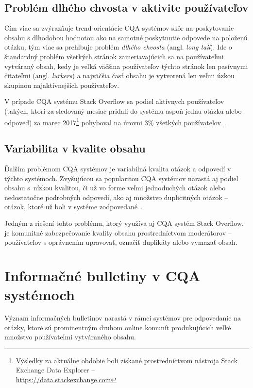 \subsection{Problém dlhého chvosta v aktivite používateľov}
Čím viac sa zvýrazňuje trend orientácie CQA systémov skôr na poskytovanie obsahu s dlhodobou hodnotou ako na samotné
poskytnutie odpovede na položenú otázku, tým viac sa prehlbuje problém \emph{dlhého chvosta} (angl. \emph{long tail}).
Ide o štandardný problém všetkých stránok zameriavajúcich sa na používateľmi vytváraný obsah, kedy je veľká väčšina
používateľov týchto stránok len pasívnymi čitateľmi (angl. \emph{lurkers}) a najväčšia časť obsahu je vytvorená len veľmi
úzkou skupinou najaktívnejších používateľov.

V prípade CQA systému Stack Overflow sa podiel aktívnych používateľov (takých, ktorí za sledovaný mesiac pridali
do systému aspoň jednu otázku alebo odpoveď) za marec 2017\footnote{Výsledky za aktuálne obdobie boli získané prostredníctvom nástroja Stack
Exchange Data Explorer -- \\\url{https://data.stackexchange.com}} pohyboval na úrovni 3\% všetkých
používateľov~\cite{Srba2016SOFail}.

\subsection{Variabilita v kvalite obsahu}
Ďalším problémom CQA systémov je variabilná kvalita otázok a odpovedí v týchto systémoch. Zvyšujúcou sa popularitou CQA
systémov narastá aj podiel obsahu s~nízkou kvalitou, či už vo forme veľmi jednoduchých otázok alebo nedostatočne
podrobných odpovedí, ako aj množstvo duplicitných otázok -- otázok, ktoré už boli v systéme
zodpovedané~\cite{Srba2016SOFail,Ponzanelli2014}.

Jedným z riešení tohto problému, ktorý využíva aj CQA systém Stack Overflow, je komunitné zabezpečovanie kvality obsahu
prostredníctvom moderátorov -- používateľov s oprávnením upravovať, označiť duplikáty alebo vymazať obsah.


\section{Informačné bulletiny v CQA systémoch}

Význam informačných bulletinov narastá v rámci systémov pre odpovedanie na otázky, ktoré sú prominentným druhom
online komunít produkujúcich veľké množstvo používateľmi vytváraného obsahu.

